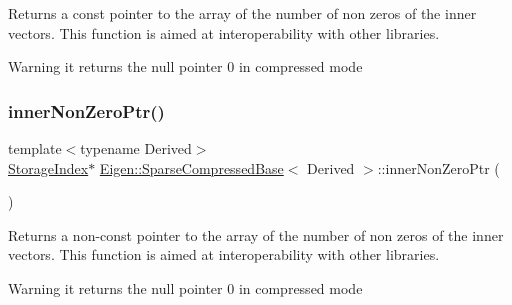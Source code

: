 \begin{DoxyReturn}{Returns}
a const pointer to the array of the number of non zeros of the inner vectors. This function is aimed at interoperability with other libraries. 
\end{DoxyReturn}
\begin{DoxyWarning}{Warning}
it returns the null pointer 0 in compressed mode 
\end{DoxyWarning}
\mbox{\label{class_eigen_1_1_sparse_compressed_base_a411e972b097e6aef225415a4c2d0a0b5}} 
\subsubsection{\texorpdfstring{innerNonZeroPtr()}{innerNonZeroPtr()}\hspace{0.1cm}{\footnotesize\ttfamily [2/2]}}
{\footnotesize\ttfamily template$<$typename Derived$>$ \\
\mbox{\hyperlink{class_eigen_1_1_sparse_matrix_base_a0b540ba724726ebe953f8c0df06081ed}{Storage\+Index}}$\ast$ \mbox{\hyperlink{class_eigen_1_1_sparse_compressed_base}{Eigen\+::\+Sparse\+Compressed\+Base}}$<$ Derived $>$\+::inner\+Non\+Zero\+Ptr (\begin{DoxyParamCaption}{ }\end{DoxyParamCaption})\hspace{0.3cm}{\ttfamily [inline]}}

\begin{DoxyReturn}{Returns}
a non-\/const pointer to the array of the number of non zeros of the inner vectors. This function is aimed at interoperability with other libraries. 
\end{DoxyReturn}
\begin{DoxyWarning}{Warning}
it returns the null pointer 0 in compressed mode 
\end{DoxyWarning}
\mbox{\label{class_eigen_1_1_sparse_compressed_base_a837934b33a80fe996ff20500373d3a61}} 
